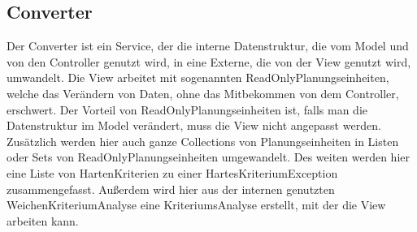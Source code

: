 \subsection{Converter}\label{subsec:converter}
Der Converter ist ein Service, der die interne Datenstruktur, die vom Model und von den Controller genutzt wird,
in eine Externe, die von der View genutzt wird, umwandelt.
Die View arbeitet mit sogenannten ReadOnlyPlanungseinheiten, welche das Verändern von Daten,
ohne das Mitbekommen von dem Controller, erschwert.
Der Vorteil von ReadOnlyPlanungseinheiten ist, falls man die Datenstruktur im Model verändert,
muss die View nicht angepasst werden.
Zusätzlich werden hier auch ganze Collections von Planungseinheiten in Listen oder Sets von ReadOnlyPlanungseinheiten umgewandelt.
Des weiten werden hier eine Liste von HartenKriterien zu einer HartesKriteriumException zusammengefasst.
Außerdem wird hier aus der internen genutzten WeichenKriteriumAnalyse eine KriteriumsAnalyse erstellt, mit der die View arbeiten kann.